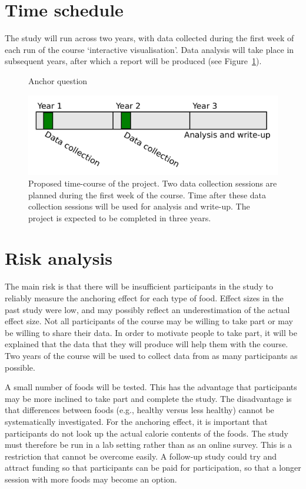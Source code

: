 \documentclass[a4paper,doc,natbib]{apa6}
\begin{document}
    \section{Time schedule}

    The study will run across two years, with data collected during the first week of each run of the course `interactive visualisation'. Data analysis will take place in subsequent years, after which a report will be produced (see Figure~\ref{fig:time_course}).

    \begin{figure}[h!]
        \caption{Anchor question}
        \includegraphics[width=0.95\linewidth]{Images/time_course.pdf}
        \caption{Proposed time-course of the project. Two data collection sessions are planned during the first week of the course. Time after these data collection sessions will be used for analysis and write-up. The project is expected to be completed in three years.}
        \label{fig:time_course}
    \end{figure}


    \section{Risk analysis}

    The main risk is that there will be insufficient participants in the study to reliably measure the anchoring effect for each type of food. Effect sizes in the past study \citep{shanks2020incidental} were low, and may possibly reflect an underestimation of the actual effect size. Not all participants of the course may be willing to take part or may be willing to share their data. In order to motivate people to take part, it will be explained that the data that they will produce will help them with the course. Two years of the course will be used to collect data from as many participants as possible.

    A small number of foods will be tested. This has the advantage that participants may be more inclined to take part and complete the study. The disadvantage is that differences between foods (e.g., healthy versus less healthy) cannot be systematically investigated. For the anchoring effect, it is important that participants do not look up the actual calorie contents of the foods. The study must therefore be run in a lab setting rather than as an online survey. This is a restriction that cannot be overcome easily. A follow-up study could try and attract funding so that participants can be paid for participation, so that a longer session with more foods may become an option.
\end{document}
